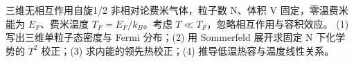 三维无相互作用自旋1/2 非相对论费米气体，粒子数 N、体积 V 固定，零温费米能为 \(E_F\)、费米温度 \(T_F=E_F/k_B\)。考虑 \(T\ll T_F\)，忽略相互作用与容积效应。
(1) 写出三维单粒子态密度与 Fermi 分布；(2) 用 Sommerfeld 展开求固定 N 下化学势的 \(T^2\) 校正；(3) 求内能的领先热校正；(4) 推导低温热容与温度线性关系。

